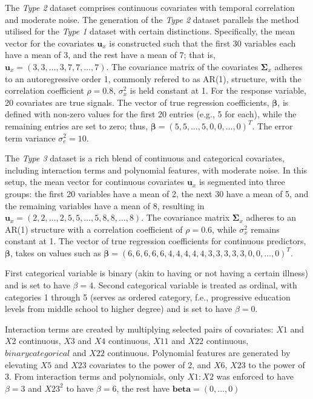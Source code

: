 \documentclass[
  11pt,
]{article}
\begin{document}
\hfill\break
\hfill\break

The \emph{Type 2} dataset comprises continuous covariates with temporal
correlation and moderate noise. The generation of the \emph{Type 2}
dataset parallels the method utilised for the \emph{Type 1} dataset with
certain distinctions. Specifically, the mean vector for the covariates
\(\mathbf{u}_x\) is constructed such that the first 30 variables each
have a mean of 3, and the rest have a mean of 7; that is,
\(\mathbf{u}_x = (3, 3, \ldots, 3, 7, 7, \ldots, 7)\). The covariance
matrix of the covariates \(\mathbf{\Sigma}_x\) adheres to an
autoregressive order 1, commonly refered to as AR(1), structure, with
the correlation coefficient \(\rho = 0.8\), \(\sigma_x^2\) is held
constant at 1. For the response variable, 20 covariates are true
signals. The vector of true regression coefficients,
\(\boldsymbol{\beta}\), is defined with non-zero values for the first 20
entries (e.g., 5 for each), while the remaining entries are set to zero;
thus, \(\boldsymbol{\beta} = (5, 5, \ldots, 5, 0, 0, \ldots, 0)^T\). The
error term variance \(\sigma_e^2 = 10\).

\hfill\break
\hfill\break

The \emph{Type 3} dataset is a rich blend of continuous and categorical
covariates, including interaction terms and polynomial features, with
moderate noise. In this setup, the mean vector for continuous covariates
\(\mathbf{u}_x\) is segmented into three groups: the first 20 variables
have a mean of 2, the next 30 have a mean of 5, and the remaining
variables have a mean of 8, resulting in
\(\mathbf{u}_x = (2, 2, \ldots, 2, 5, 5, \ldots, 5, 8, 8, \ldots, 8)\).
The covariance matrix \(\mathbf{\Sigma}_x\) adheres to an AR(1)
structure with a correlation coefficient of \(\rho = 0.6\), while
\(\sigma_x^2\) remains constant at 1. The vector of true regression
coefficients for continuous predictors, \(\boldsymbol{\beta}\), takes on
values such as
\(\boldsymbol{\beta} = (6, 6, 6, 6, 6, 4, 4, 4, 4, 4, 3, 3, 3, 3, 3, 0, 0, \ldots, 0)^T\).

First categorical variable is binary (akin to having or not having a
certain illness) and is set to have \(\beta = 4\). Second categorical
variable is treated as ordinal, with categories 1 through 5 (serves as
ordered category, f.e., progressive education levels from middle school
to higher degree) and is set to have \(\beta = 0\).

Interaction terms are created by multiplying selected pairs of
covariates: \(X1\) and \(X2\) continuous, \(X3\) and \(X4\) continuous,
\(X11\) and \(X22\) continuous, \(binary categorical\) and \(X22\)
continuous. Polynomial features are generated by elevating \(X5\) and
\(X23\) covariates to the power of 2, and \(X6\), \(X23\) to the power
of 3. From interaction terms and polynomials, only \(X1 : X2\) was
enforced to have \(\beta = 3\) and \(X23^2\) to have \(\beta = 6\), the
rest have \(\boldsymbol{beta} = (0, \ldots, 0)\)
\end{document}
